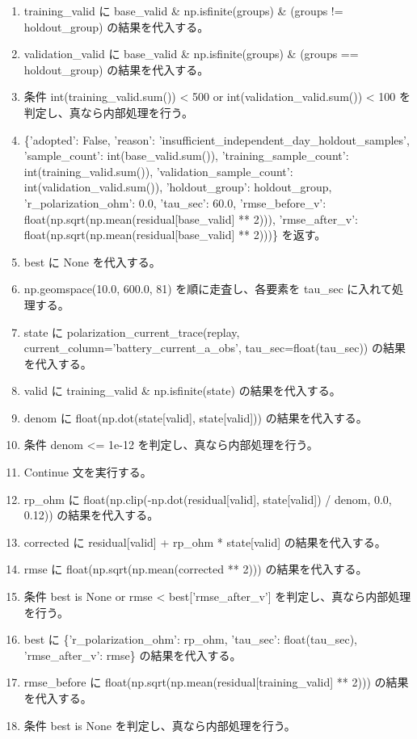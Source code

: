 \documentclass[a4paper,11pt]{article}
\begin{document}
\begin{enumerate}[leftmargin=1.8em]
\item training\_valid に base\_valid \& np.isfinite(groups) \& (groups != holdout\_group) の結果を代入する。
\item validation\_valid に base\_valid \& np.isfinite(groups) \& (groups == holdout\_group) の結果を代入する。
\item 条件 int(training\_valid.sum()) < 500 or int(validation\_valid.sum()) < 100 を判定し、真なら内部処理を行う。
\item   \{'adopted': False, 'reason': 'insufficient\_independent\_day\_holdout\_samples', 'sample\_count': int(base\_valid.sum()), 'training\_sample\_count': int(training\_valid.sum()), 'validation\_sample\_count': int(validation\_valid.sum()), 'holdout\_group': holdout\_group, 'r\_polarization\_ohm': 0.0, 'tau\_sec': 60.0, 'rmse\_before\_v': float(np.sqrt(np.mean(residual[base\_valid] ** 2))), 'rmse\_after\_v': float(np.sqrt(np.mean(residual[base\_valid] ** 2)))\} を返す。
\item best に None を代入する。
\item np.geomspace(10.0, 600.0, 81) を順に走査し、各要素を tau\_sec に入れて処理する。
\item   state に polarization\_current\_trace(replay, current\_column='battery\_current\_a\_obs', tau\_sec=float(tau\_sec)) の結果を代入する。
\item   valid に training\_valid \& np.isfinite(state) の結果を代入する。
\item   denom に float(np.dot(state[valid], state[valid])) の結果を代入する。
\item   条件 denom <= 1e-12 を判定し、真なら内部処理を行う。
\item     Continue 文を実行する。
\item   rp\_ohm に float(np.clip(-np.dot(residual[valid], state[valid]) / denom, 0.0, 0.12)) の結果を代入する。
\item   corrected に residual[valid] + rp\_ohm * state[valid] の結果を代入する。
\item   rmse に float(np.sqrt(np.mean(corrected ** 2))) の結果を代入する。
\item   条件 best is None or rmse < best['rmse\_after\_v'] を判定し、真なら内部処理を行う。
\item     best に \{'r\_polarization\_ohm': rp\_ohm, 'tau\_sec': float(tau\_sec), 'rmse\_after\_v': rmse\} の結果を代入する。
\item rmse\_before に float(np.sqrt(np.mean(residual[training\_valid] ** 2))) の結果を代入する。
\item 条件 best is None を判定し、真なら内部処理を行う。

\end{enumerate}
\end{document}
